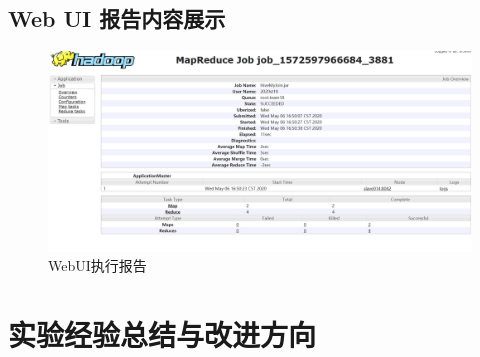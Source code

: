 \documentclass[a4paper,UTF8]{article}
\numberwithin{equation}{section}
\begin{document}
\subsection{Web UI 报告内容展示}
\begin{figure}[H]
	\centering
	\includegraphics[width = 15cm]{job.PNG}
	\caption{WebUI执行报告}
\end{figure}
\section{实验经验总结与改进方向}











\end{document}
